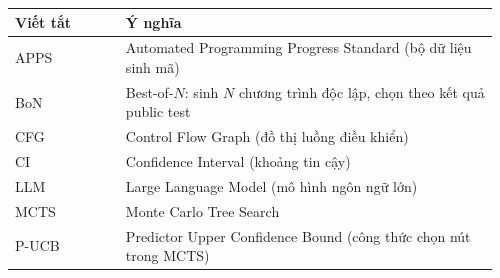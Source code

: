 {
\begin{longtable}{@{}p{0.22\linewidth}p{0.74\linewidth}@{}}
\toprule
\textbf{Viết tắt} & \textbf{Ý nghĩa} \\
\midrule
\endhead
\bottomrule
\endfoot
APPS & Automated Programming Progress Standard (bộ dữ liệu sinh mã) \\
BoN & Best-of-$N$: sinh $N$ chương trình độc lập, chọn theo kết quả public test \\
CFG & Control Flow Graph (đồ thị luồng điều khiển) \\
CI & Confidence Interval (khoảng tin cậy) \\
LLM & Large Language Model (mô hình ngôn ngữ lớn) \\
MCTS & Monte Carlo Tree Search \\
P-UCB & Predictor Upper Confidence Bound (công thức chọn nút trong MCTS) \\
\end{longtable}}
